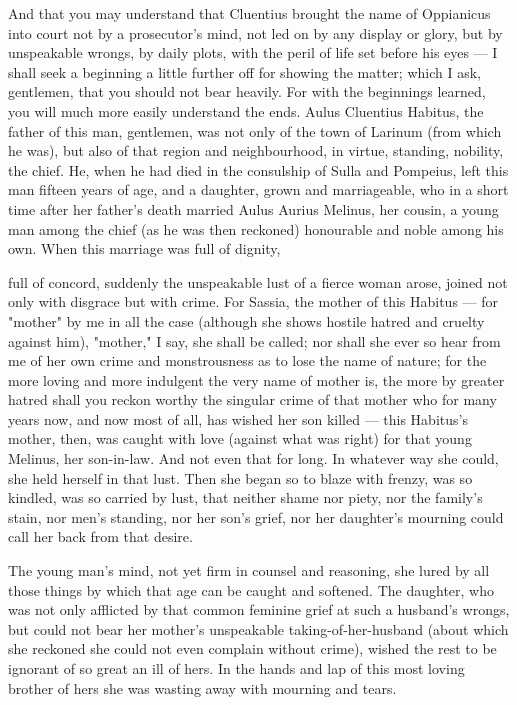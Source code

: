  And that you may understand that Cluentius brought the name of Oppianicus into court not by a prosecutor's mind, not led on by any display or glory, but by unspeakable wrongs, by daily plots, with the peril of life set before his eyes --- I shall seek a beginning a little further off for showing the matter; which I ask, gentlemen, that you should not bear heavily. For with the beginnings learned, you will much more easily understand the ends. Aulus Cluentius Habitus, the father of this man, gentlemen, was not only of the town of Larinum (from which he was), but also of that region and neighbourhood, in virtue, standing, nobility, the chief. He, when he had died in the consulship of Sulla and Pompeius, left this man fifteen years of age, and a daughter, grown and marriageable, who in a short time after her father's death married Aulus Aurius Melinus, her cousin, a young man among the chief (as he was then reckoned) honourable and noble among his own. When this marriage was full of dignity,

 full of concord, suddenly the unspeakable lust of a fierce woman arose, joined not only with disgrace but with crime. For Sassia, the mother of this Habitus --- for "mother" by me in all the case (although she shows hostile hatred and cruelty against him), "mother," I say, she shall be called; nor shall she ever so hear from me of her own crime and monstrousness as to lose the name of nature; for the more loving and more indulgent the very name of mother is, the more by greater hatred shall you reckon worthy the singular crime of that mother who for many years now, and now most of all, has wished her son killed --- this Habitus's mother, then, was caught with love (against what was right) for that young Melinus, her son-in-law. And not even that for long. In whatever way she could, she held herself in that lust. Then she began so to blaze with frenzy, was so kindled, was so carried by lust, that neither shame nor piety, nor the family's stain, nor men's standing, nor her son's grief, nor her daughter's mourning could call her back from that desire.

 The young man's mind, not yet firm in counsel and reasoning, she lured by all those things by which that age can be caught and softened. The daughter, who was not only afflicted by that common feminine grief at such a husband's wrongs, but could not bear her mother's unspeakable taking-of-her-husband (about which she reckoned she could not even complain without crime), wished the rest to be ignorant of so great an ill of hers. In the hands and lap of this most loving brother of hers she was wasting away with mourning and tears.

